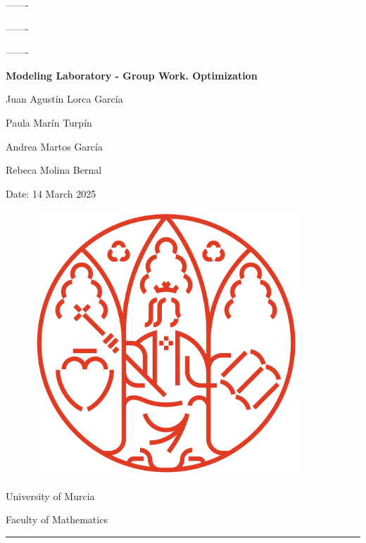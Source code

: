 \begin{titlepage}
    \begin{center}
        {\Huge \textsc{-------}}

        {\Huge \textsc{-------}}  
        
        {\Huge \textsc{-------}}
        
        {\Large{\textbf{Modeling Laboratory - Group Work. Optimization}}}
        
        \vspace{20mm}
        {\large{ 
          Juan Agustín Lorca García

          Paula Marín Turpín
          
          Andrea Martos García

          Rebeca Molina Bernal
          
          Date: 14 March 2025 
          }}

          \vspace{20mm}
        \begin{figure}[ht]
             \centerline{\includegraphics[width=10cm,height=10cm]{portada/nuevo_logo_umu.png}}
            \label{logo_umu}
        \end{figure}

        \vspace{20mm}
        {\large {University of Murcia}}
        
        {\large {Faculty of Mathematics}}
        \textcolor{rojo}{\rule{\linewidth}{0.55mm}}
    \end{center}
\end{titlepage}